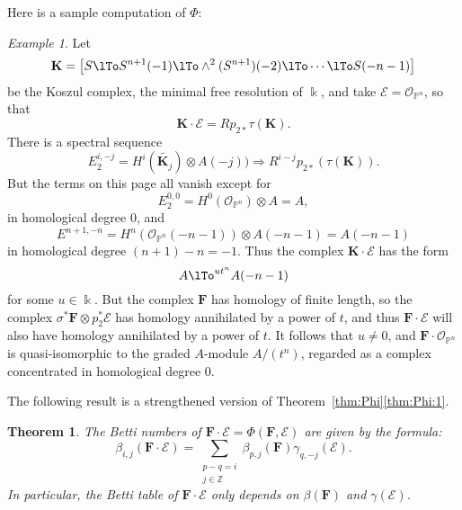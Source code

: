 \documentclass[12pt]{amsart}
\newtheorem{theorem}[lemma]{Theorem}
\theoremstyle{definition}
\theoremstyle{remark}
\newtheorem{example}[lemma]{Example}
\newcommand{\kk}{\Bbbk}
\newcommand{\PP}{\mathbb{P}}
\newcommand{\ZZ}{\mathbb{Z}}
\newcommand{\cO}{\mathcal{O}}
\newcommand{\cE}{\mathcal{E}}
\newcommand{\bK}{\mathbf{K}}
\newcommand{\FF}{\mathbf{F}}
\begin{document}
Here is a sample computation of $\Phi$: 

\begin{example} Let 
$$
\bK = \bigl[ S\lTo S^{n+1}(-1) \lTo \wedge^{2}(S^{n+1})(-2) \lTo\cdots\lTo S(-n-1)\bigr]
$$
be the Koszul complex, the minimal free resolution of $\kk$, and take
$\cE = \cO_{\PP^{n}}$, so that 
$$
\bK \cdot \cE = Rp_{2*}\tau(\bK).$$  
There is a spectral sequence
\[
E_2^{i,-j}=H^i(\widetilde{\bK_j})\otimes A(-j))\Rightarrow R^{i-j}p_{2*}(\tau(\bK)).
\]
But 
the terms on this page all vanish except for
$$
E^{0,0}_2= H^{0}(\cO_{\PP^{n}})\otimes A = A,
$$
in homological degree 0, and 
$$
E^{n+1,-n}=H^{n}(\cO_{\PP^{n}}(-n-1)) \otimes  A(-n-1) = A(-n-1)
$$
in homological degree $(n+1)-n = -1$.
Thus the complex $\bK \cdot \cE$ has the form
$$
A\lTo^{ut^{n}}A(-n-1)
$$
for some $u\in \kk$. But the complex $\FF$ has homology of finite length, so the complex $\sigma^{*}\FF \otimes p_{2}^{*}\cE$ has homology annihilated by a power of $t$, and thus $\FF\cdot \cE$ will also have homology annihilated by a power of $t$. It follows that $u\neq 0$, and $\FF\cdot \cO_{\PP^{n}}$ is quasi-isomorphic to the graded $A$-module $A/(t^{n})$, regarded as a complex concentrated in homological degree 0.
\end{example}


The following result is a strengthened version of Theorem~\ref{thm:Phi}\eqref{thm:Phi:1}.
\begin{theorem}\label{thm:betti numbers of pairing}
The Betti numbers of $\FF\cdot \cE = \Phi(\FF,\cE)$ are given by the formula:
\[
\beta_{i,j}(\FF\cdot \cE)=\sum_{\substack{p-q=i\\ j\in \ZZ}}  \beta_{p,j}(\FF)\gamma_{q,-j}(\cE).
\]
In particular, the Betti table of $\FF\cdot \cE$ only depends on $\beta(\FF)$ and $\gamma(\cE)$.
\end{theorem}
\end{document}
